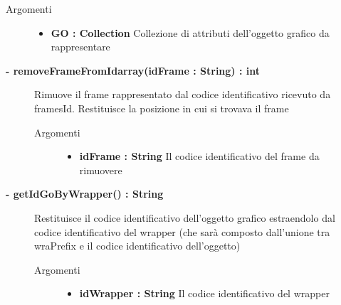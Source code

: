 \begin{description}
\begin{description}
		\begin{description}
			\item[Argomenti] \hfill
				\begin{itemize}
				
					\item \textbf{GO : Collection		} \hfill
					Collezione di attributi dell'oggetto grafico da rappresentare
					
				\end{itemize}
		\end{description}
	\end{description}
	
	\begin{description}
		\item[\textbf{\color{blue}- removeFrameFromIdarray(idFrame : String) : int			}] \hfill
			Rimuove il frame rappresentato dal codice identificativo ricevuto da framesId. Restituisce la posizione in cui si trovava il frame
			
		\begin{description}
			\item[Argomenti] \hfill
				\begin{itemize}
				
					\item \textbf{idFrame : String		} \hfill
					Il codice identificativo del frame da rimuovere
					
				\end{itemize}
				
		\end{description}
	\end{description}
	
	\begin{description}
		\item[\textbf{\color{blue}- getIdGoByWrapper() : String			}] \hfill
			Restituisce il codice identificativo dell'oggetto grafico estraendolo dal codice identificativo del wrapper (che sarà composto dall'unione tra wraPrefix e il codice identificativo dell'oggetto)
			
		\begin{description}
			\item[Argomenti] \hfill
				\begin{itemize}
				
					\item \textbf{idWrapper : String		} \hfill
					Il codice identificativo del wrapper
					

\end{itemize}
\end{description}
\end{description}
\end{description}

